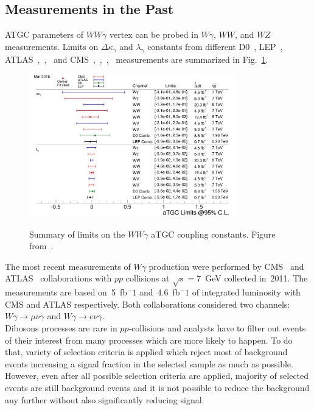 \subsection{Measurements in the Past}
\label{sec:WgAbout_PastMeas}

ATGC parameters of $WW\gamma$ vertex can be probed in $W\gamma$, $WW$, and $WZ$ measurements. Limits on $\Delta \kappa_\gamma$ and $\lambda_\gamma$ constants from different D0~\cite{ref_D0_aTGC_comb}, LEP~\cite{ref_LEP_aTGC_comb}, ATLAS~\cite{ref_7TeV_ATLAS},~\cite{ref_ATLAS_WW_8TeV},~\cite{ref_ATLAS_VW_8TeV} and CMS~\cite{ref_7TeV_CMS},~\cite{ref_CMS_WW_7TeV},~\cite{ref_CMS_WW_8TeV},~\cite{ref_CMS_VW_7TeV} measurements are summarized in Fig.~\ref{fig:aTGC_cg}.\\ 

\begin{figure}[htb]
  \begin{center}
    {\includegraphics[width=0.80\textwidth]{../figs/WgAbout/aTGC_cg.png}}
    \caption{Summary of limits on the $WW\gamma$ aTGC coupling constants. Figure from~\cite{ref_twiki_SMP_ATGC}.}
    \label{fig:aTGC_cg}
  \end{center}
\end{figure}

The most recent measurements of $W\gamma$ production were performed by CMS~\cite{ref_7TeV_CMS} and ATLAS~\cite{ref_7TeV_ATLAS} collaborations with $pp$ collisions at $\sqrt{s}=7$~GeV collected in~2011. The measurements are based on~5~fb$^-1$ and~4.6~fb$^-1$ of integrated luminosity with CMS and ATLAS respectively. Both collaborations considered two channels: $W\gamma\rightarrow\mu\nu\gamma$ and $W\gamma\rightarrow e\nu\gamma$.\\

Dibosons processes are rare in $pp$-collisions and analysts have to filter out events of their interest from many processes which are more likely to happen. To do that, variety of selection criteria is applied which reject most of background events increasing a signal fraction in the selected sample  as much as possible. However, even after all possible selection criteria are applied, majority of selected events are still background events and it is not possible to reduce the background any further without also significantly reducing signal.\\

